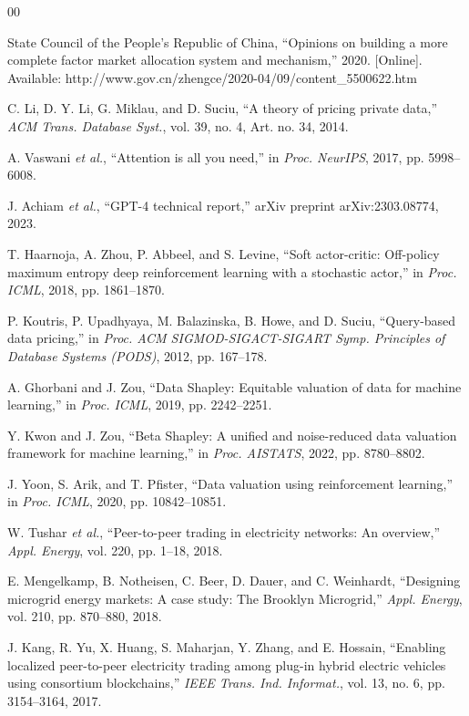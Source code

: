 \documentclass{ieeeaccess}
\begin{document}
\begin{thebibliography}{00}

 State Council of the People's Republic of China, ``Opinions on building a more complete factor market allocation system and mechanism,'' 2020. [Online]. Available: http://www.gov.cn/zhengce/2020-04/09/content_5500622.htm

 C. Li, D. Y. Li, G. Miklau, and D. Suciu, ``A theory of pricing private data,'' \emph{ACM Trans. Database Syst.}, vol. 39, no. 4, Art. no. 34, 2014.

 A. Vaswani \emph{et al.}, ``Attention is all you need,'' in \emph{Proc. NeurIPS}, 2017, pp. 5998--6008.

 J. Achiam \emph{et al.}, ``GPT-4 technical report,'' arXiv preprint arXiv:2303.08774, 2023.

 T. Haarnoja, A. Zhou, P. Abbeel, and S. Levine, ``Soft actor-critic: Off-policy maximum entropy deep reinforcement learning with a stochastic actor,'' in \emph{Proc. ICML}, 2018, pp. 1861--1870.

 P. Koutris, P. Upadhyaya, M. Balazinska, B. Howe, and D. Suciu, ``Query-based data pricing,'' in \emph{Proc. ACM SIGMOD-SIGACT-SIGART Symp. Principles of Database Systems (PODS)}, 2012, pp. 167--178.

 A. Ghorbani and J. Zou, ``Data Shapley: Equitable valuation of data for machine learning,'' in \emph{Proc. ICML}, 2019, pp. 2242--2251.

 Y. Kwon and J. Zou, ``Beta Shapley: A unified and noise-reduced data valuation framework for machine learning,'' in \emph{Proc. AISTATS}, 2022, pp. 8780--8802.

 J. Yoon, S. Arik, and T. Pfister, ``Data valuation using reinforcement learning,'' in \emph{Proc. ICML}, 2020, pp. 10842--10851.

 W. Tushar \emph{et al.}, ``Peer-to-peer trading in electricity networks: An overview,'' \emph{Appl. Energy}, vol. 220, pp. 1--18, 2018.

 E. Mengelkamp, B. Notheisen, C. Beer, D. Dauer, and C. Weinhardt, ``Designing microgrid energy markets: A case study: The Brooklyn Microgrid,'' \emph{Appl. Energy}, vol. 210, pp. 870--880, 2018.

 J. Kang, R. Yu, X. Huang, S. Maharjan, Y. Zhang, and E. Hossain, ``Enabling localized peer-to-peer electricity trading among plug-in hybrid electric vehicles using consortium blockchains,'' \emph{IEEE Trans. Ind. Informat.}, vol. 13, no. 6, pp. 3154--3164, 2017.


\end{thebibliography}
\end{document}
